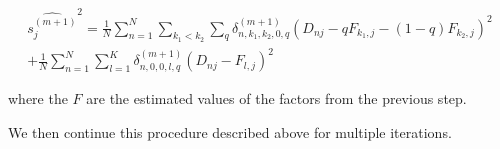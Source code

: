 \documentclass[11pt,authoryear]{article}
\begin{document}
\begin{multline}
\widehat{s_{j}^{(m+1)}}^2 = \frac{1}{N}\sum_{n=1}^{N} \sum_{k_1 < k_2} \sum_{q} \delta^{(m+1)}_{n, k_1, k_2, 0, q} (D_{nj} - q F_{k_1,j} - (1-q) F_{k_2,j})^2 \\
+  \frac{1}{N}\sum_{n=1}^{N} \sum_{l=1}^{K} \delta^{(m+1)}_{n, 0, 0, l, q} (D_{nj} - F_{l,j} )^2
\end{multline}

where the $F$ are the estimated values of the factors from the previous step.

We then continue this procedure described above for multiple iterations.
\end{document}
